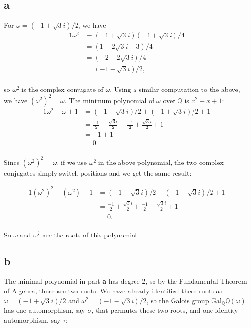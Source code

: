 \documentclass{article}
\begin{document}
\subsection*{a}

For $\omega = (-1+ \sqrt{3} i)/2$, we have 
\begin{alignat*}{1}
    \omega^2 &= (-1 + \sqrt{3}i)(-1+ \sqrt{3}i)/4 \\ 
    &= (1 - 2 \sqrt{3} i - 3)/4 \\ 
    &= (-2 - 2 \sqrt{3}i)/4 \\ 
    &= (-1 - \sqrt{3}i)/2, \\ 
\end{alignat*}

so $\omega^2$ is the complex conjugate of $\omega$.  Using a similar computation 
to the above, we have $(\omega^2)^2 = \omega$.
The minimum polynomial of $\omega$ 
over $\mathbb{Q}$ is $x^2 + x + 1$: \\ 

\begin{alignat*}{1}
    \omega^2 + \omega + 1 &= (-1 - \sqrt{3}i)/2 + (-1 + \sqrt{3}i)/2 + 1 \\ 
    &= \frac{-1}{2} - \frac{\sqrt{3}i}{2} + \frac{-1}{2} + \frac{\sqrt{3}i}{2} + 1 \\ 
    &= -1 + 1 \\ 
    &= 0. \\ 
\end{alignat*}

Since $(\omega^2)^2 = \omega$, if we use $\omega^2$ in the above polynomial, 
the two complex conjugates simply switch positions and we get the same result:

\begin{alignat*}{1}
  (\omega ^2)^2 + (\omega ^2) + 1 &= (-1 + \sqrt{3}i)/2 + (-1 - \sqrt{3}i)/2 + 1 \\ 
  &= \frac{-1}{2} + \frac{\sqrt{3}i}{2} + \frac{-1}{2} - \frac{\sqrt{3}i}{2} + 1 \\ 
  &= 0. \\ 
\end{alignat*}

So $\omega$ and $\omega^2$ are the roots of this polynomial.

\newpage

\subsection*{b}

The minimal polynomial in part \textbf{a} has degree 2, so by the 
Fundamental Theorem of Algebra, there are two roots.  We have already identified 
these roots as $\omega = (-1+ \sqrt{3} i)/2$ and $\omega^2 = (-1 - \sqrt{3} i)/2$, 
so the Galois group $\mathrm{Gal}_{\mathbb{Q}}\mathbb{Q}(\omega)$ has one 
automorphism, say $\sigma$, that permutes these two roots,
 and one identity automorphism, say $\tau$: 
\end{document}
